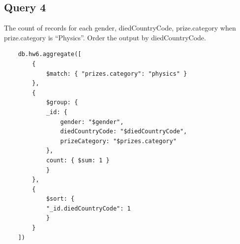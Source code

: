 \documentclass{article}
\begin{document}
\subsection{Query 4}
The count of records for each gender, diedCountryCode, prize.category when
prize.category is ``Physics''. Order the output by diedCountryCode.

\begin{verbatim}
    db.hw6.aggregate([
        {
            $match: { "prizes.category": "physics" }
        },
        {
            $group: {
            _id: {
                gender: "$gender",
                diedCountryCode: "$diedCountryCode",
                prizeCategory: "$prizes.category"
            },
            count: { $sum: 1 }
            }
        },
        {
            $sort: {
            "_id.diedCountryCode": 1
            }
        }
    ])
\end{verbatim}
\end{document}
